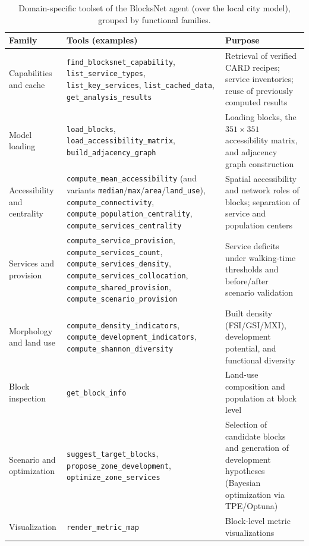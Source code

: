 \begin{table}[ht]
\centering
\footnotesize
\begin{tabularx}{\textwidth}{p{2.7cm} X X}
\hline
\textbf{Family} & \textbf{Tools (examples)} & \textbf{Purpose} \\
\hline
Capabilities and cache & \texttt{find\_blocksnet\_capability}, \texttt{list\_service\_types}, \texttt{list\_key\_services}, \texttt{list\_cached\_data}, \texttt{get\_analysis\_results} & Retrieval of verified CARD recipes; service inventories; reuse of previously computed results \\[2pt]
Model loading & \texttt{load\_blocks}, \texttt{load\_accessibility\_matrix}, \texttt{build\_adjacency\_graph} & Loading blocks, the $351 \times 351$ accessibility matrix, and adjacency graph construction \\[2pt]
Accessibility and centrality & \texttt{compute\_mean\_accessibility} (and variants \texttt{median}/\texttt{max}/\texttt{area}/\texttt{land\_use}), \texttt{compute\_connectivity}, \texttt{compute\_population\_centrality}, \texttt{compute\_services\_centrality} & Spatial accessibility and network roles of blocks; separation of service and population centers \\[2pt]
Services and provision & \texttt{compute\_service\_provision}, \texttt{compute\_services\_count}, \texttt{compute\_services\_density}, \texttt{compute\_services\_collocation}, \texttt{compute\_shared\_provision}, \texttt{compute\_scenario\_provision} & Service deficits under walking-time thresholds and before/after scenario validation \\[2pt]
Morphology and land use & \texttt{compute\_density\_indicators}, \texttt{compute\_development\_indicators}, \texttt{compute\_shannon\_diversity} & Built density (FSI/GSI/MXI), development potential, and functional diversity \\[2pt]
Block inspection & \texttt{get\_block\_info} & Land-use composition and population at block level \\[2pt]
Scenario and optimization & \texttt{suggest\_target\_blocks}, \texttt{propose\_zone\_development}, \texttt{optimize\_zone\_services} & Selection of candidate blocks and generation of development hypotheses (Bayesian optimization via TPE/Optuna) \\[2pt]
Visualization & \texttt{render\_metric\_map} & Block-level metric visualizations \\
\hline
\end{tabularx}
\caption{Domain-specific toolset of the BlocksNet agent (over the local city model), grouped by functional families.}
\label{table:blocksnet_tools}
\end{table}

